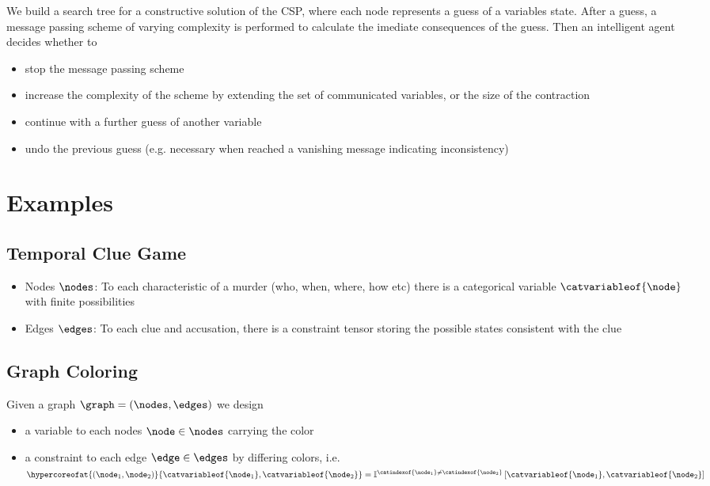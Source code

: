 \documentclass[aps,onecolumn,nofootinbib,pra]{article}
\begin{document}
    We build a search tree for a constructive solution of the CSP, where each node represents a guess of a variables state.
    After a guess, a message passing scheme of varying complexity is performed to calculate the imediate consequences of the guess.
    Then an intelligent agent decides whether to
    \begin{itemize}
        \item stop the message passing scheme
        \item increase the complexity of the scheme by extending the set of communicated variables, or the size of the contraction
        \item continue with a further guess of another variable
        \item undo the previous guess (e.g. necessary when reached a vanishing message indicating inconsistency)
    \end{itemize}


    \section{Examples}

    \subsection{Temporal Clue Game}

    \begin{itemize}
        \item Nodes $\nodes$: To each characteristic of a murder (who, when, where, how etc) there is a categorical variable $\catvariableof{\node}$ with finite possibilities
        \item Edges $\edges$: To each clue and accusation, there is a constraint tensor storing the possible states consistent with the clue
    \end{itemize}

    \subsection{Graph Coloring}

    Given a graph $\graph=(\nodes,\edges)$ we design
    \begin{itemize}
        \item a variable to each nodes $\node\in\nodes$ carrying the color
        \item a constraint to each edge $\edge\in\edges$ by differing colors, i.e. $\hypercoreofat{(\node_1,\node_2)}{\catvariableof{\node_1},\catvariableof{\node_2}} = \onesofat{\catindexof{\node_1}\neq\catindexof{\node_2}}{\catvariableof{\node_1},\catvariableof{\node_2}} $
    \end{itemize}
\end{document}
